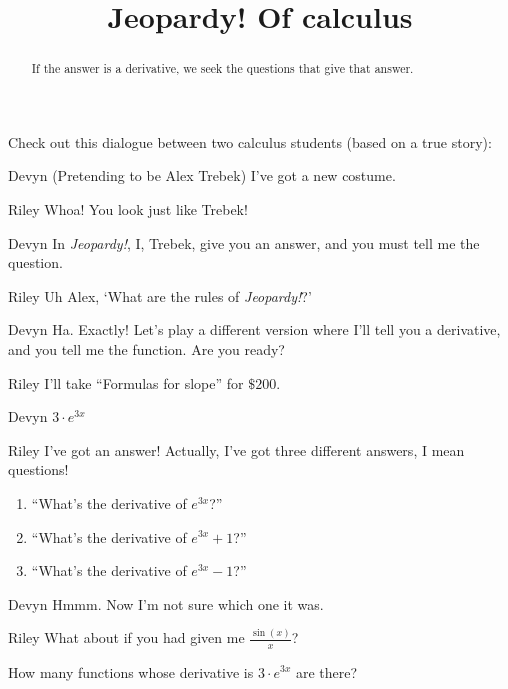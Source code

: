 \documentclass{ximera}
\title[Break-Ground:]{Jeopardy! Of calculus}
\begin{document}
\begin{abstract}
  If the answer is a derivative, we seek the questions that give that answer.
\end{abstract}
\maketitle

Check out this dialogue between two calculus students (based on a true story):

\begin{dialogue}
\item[Devyn] (Pretending to be Alex Trebek) I've got a new costume.
\item[Riley] Whoa! You look just like Trebek!
\item[Devyn] In \textit{Jeopardy!}, I, Trebek, give you an answer, and you must tell me the question.
\item[Riley] Uh Alex, `What are the rules of \textit{Jeopardy!}?'
\item[Devyn] Ha. Exactly! Let's play a different version where I'll
  tell you a derivative, and you tell me the function.  Are you ready?
\item[Riley] I'll take ``Formulas for slope'' for $\$200$.
\item[Devyn] $3\cdot e^{3x}$  
\item[Riley] I've got an answer!  Actually, I've got three different
  answers, I mean questions!
  \begin{enumerate}
  \item ``What's the derivative of $e^{3x}$?''
  \item ``What's the derivative of $e^{3x}+1$?''
  \item ``What's the derivative of $e^{3x}-1$?''
  \end{enumerate}
\item[Devyn] Hmmm. Now I'm not sure which one it was.
\item[Riley] What about if you had given me $\frac{\sin(x)}{x}$?
\end{dialogue}


\begin{problem}
  How many functions whose derivative is $3\cdot e^{3x}$ are there?
  \begin{prompt}
  \begin{multipleChoice}
  \end{multipleChoice}
  \end{prompt}
\end{problem}
\end{document}
